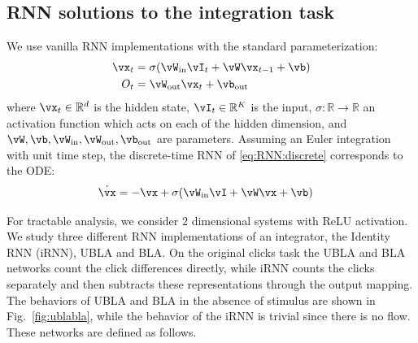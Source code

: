 \documentclass{article}
\newcounter{ct}
\newcommand{\win}{\vW_{\text{in}}}
\newcommand{\wout}{\vW_{\text{out}}}
\newcommand{\bout}{\vb_{\text{out}}}
\newcommand{\reals}{\mathbb{R}}
\theoremstyle{definition}
\theoremstyle{remark}
\begin{document}


\subsection{RNN solutions to the integration task}\label{sec:rnn:integration}
We use vanilla RNN implementations with the standard parameterization:
\begin{equation}
  \begin{aligned}
	\vx_t &= \sigma(\win \vI_t + \vW \vx_{t-1} + \vb) \label{eq:RNN:discrete}\\
	O_t &= \wout \vx_t + \bout
  \end{aligned}
\end{equation}
where $\vx_t \in \reals^d$ is the hidden state, $\vI_t \in \reals^K$ is the input,
$\sigma: \reals \to \reals$ an activation function which acts on each of the hidden dimension, and
$\vW, \vb, \win, \wout, \bout$ are parameters.
Assuming an Euler integration with unit time step, the discrete-time RNN of \eqref{eq:RNN:discrete} corresponds to the ODE:
\begin{align}
    \dot{\vx} &= -\vx + \sigma(\win \vI + \vW \vx + \vb) \label{eq:RNN:continuous}
\end{align}

For tractable analysis, we consider $2$ dimensional systems with ReLU activation.
We study three different RNN implementations of an integrator, the Identity RNN (iRNN), UBLA and BLA.
On the original clicks task the UBLA and BLA networks count the click differences directly, while iRNN counts the clicks separately and then subtracts these representations through the output mapping.
The behaviors of UBLA and BLA in the absence of stimulus are shown in Fig.~\ref{fig:ublabla}, while the behavior of the iRNN is trivial since there is no flow. These networks are defined as follows.
\end{document}
